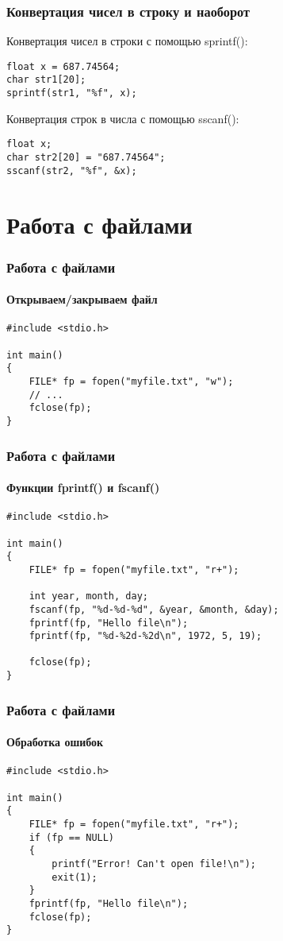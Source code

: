 \documentclass[12pt,pdf,hyperref={unicode}]{beamer}
\begin{document}
\begin{frame}[fragile]
\frametitle{Конвертация чисел в строку и наоборот} 
Конвертация чисел в строки с помощью sprintf():
\begin{lstlisting}
float x = 687.74564;
char str1[20];
sprintf(str1, "%f", x);
\end{lstlisting}
Конвертация строк в числа с помощью sscanf():
\begin{lstlisting}
float x;
char str2[20] = "687.74564";
sscanf(str2, "%f", &x);
\end{lstlisting}
\end{frame}




\section{Работа с файлами}

\begin{frame}[fragile]
\frametitle{Работа с файлами} 
\framesubtitle{Открываем/закрываем файл} 
\begin{lstlisting}
#include <stdio.h>

int main()
{
    FILE* fp = fopen("myfile.txt", "w");
    // ...
    fclose(fp);
}
\end{lstlisting}
\end{frame}

\begin{frame}[fragile]
\frametitle{Работа с файлами} 
\framesubtitle{Функции fprintf() и fscanf()} 
\begin{lstlisting}
#include <stdio.h>

int main()
{
    FILE* fp = fopen("myfile.txt", "r+");
        
    int year, month, day;
    fscanf(fp, "%d-%d-%d", &year, &month, &day);
    fprintf(fp, "Hello file\n");
    fprintf(fp, "%d-%2d-%2d\n", 1972, 5, 19);    
    
    fclose(fp);
}
\end{lstlisting}
\end{frame}


\begin{frame}[fragile]
\frametitle{Работа с файлами} 
\framesubtitle{Обработка ошибок} 
\begin{lstlisting}
#include <stdio.h>

int main()
{
    FILE* fp = fopen("myfile.txt", "r+");
    if (fp == NULL)
    {
        printf("Error! Can't open file!\n");
        exit(1);
    }
    fprintf(fp, "Hello file\n");
    fclose(fp);
}
\end{lstlisting}
\end{frame}
\end{document}
